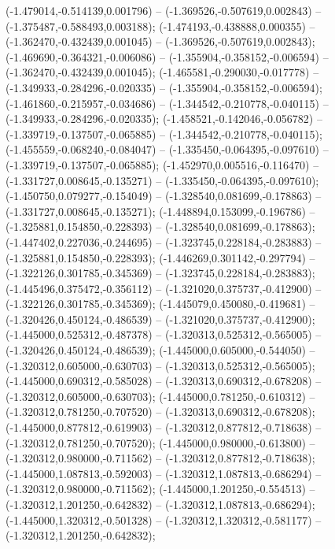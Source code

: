  (-1.479014,-0.514139,0.001796) -- (-1.369526,-0.507619,0.002843) -- (-1.375487,-0.588493,0.003188);
 (-1.474193,-0.438888,0.000355) -- (-1.362470,-0.432439,0.001045) -- (-1.369526,-0.507619,0.002843);
 (-1.469690,-0.364321,-0.006086) -- (-1.355904,-0.358152,-0.006594) -- (-1.362470,-0.432439,0.001045);
 (-1.465581,-0.290030,-0.017778) -- (-1.349933,-0.284296,-0.020335) -- (-1.355904,-0.358152,-0.006594);
 (-1.461860,-0.215957,-0.034686) -- (-1.344542,-0.210778,-0.040115) -- (-1.349933,-0.284296,-0.020335);
 (-1.458521,-0.142046,-0.056782) -- (-1.339719,-0.137507,-0.065885) -- (-1.344542,-0.210778,-0.040115);
 (-1.455559,-0.068240,-0.084047) -- (-1.335450,-0.064395,-0.097610) -- (-1.339719,-0.137507,-0.065885);
 (-1.452970,0.005516,-0.116470) -- (-1.331727,0.008645,-0.135271) -- (-1.335450,-0.064395,-0.097610);
 (-1.450750,0.079277,-0.154049) -- (-1.328540,0.081699,-0.178863) -- (-1.331727,0.008645,-0.135271);
 (-1.448894,0.153099,-0.196786) -- (-1.325881,0.154850,-0.228393) -- (-1.328540,0.081699,-0.178863);
 (-1.447402,0.227036,-0.244695) -- (-1.323745,0.228184,-0.283883) -- (-1.325881,0.154850,-0.228393);
 (-1.446269,0.301142,-0.297794) -- (-1.322126,0.301785,-0.345369) -- (-1.323745,0.228184,-0.283883);
 (-1.445496,0.375472,-0.356112) -- (-1.321020,0.375737,-0.412900) -- (-1.322126,0.301785,-0.345369);
 (-1.445079,0.450080,-0.419681) -- (-1.320426,0.450124,-0.486539) -- (-1.321020,0.375737,-0.412900);
 (-1.445000,0.525312,-0.487378) -- (-1.320313,0.525312,-0.565005) -- (-1.320426,0.450124,-0.486539);
 (-1.445000,0.605000,-0.544050) -- (-1.320312,0.605000,-0.630703) -- (-1.320313,0.525312,-0.565005);
 (-1.445000,0.690312,-0.585028) -- (-1.320313,0.690312,-0.678208) -- (-1.320312,0.605000,-0.630703);
 (-1.445000,0.781250,-0.610312) -- (-1.320312,0.781250,-0.707520) -- (-1.320313,0.690312,-0.678208);
 (-1.445000,0.877812,-0.619903) -- (-1.320312,0.877812,-0.718638) -- (-1.320312,0.781250,-0.707520);
 (-1.445000,0.980000,-0.613800) -- (-1.320312,0.980000,-0.711562) -- (-1.320312,0.877812,-0.718638);
 (-1.445000,1.087813,-0.592003) -- (-1.320312,1.087813,-0.686294) -- (-1.320312,0.980000,-0.711562);
 (-1.445000,1.201250,-0.554513) -- (-1.320312,1.201250,-0.642832) -- (-1.320312,1.087813,-0.686294);
 (-1.445000,1.320312,-0.501328) -- (-1.320312,1.320312,-0.581177) -- (-1.320312,1.201250,-0.642832);
